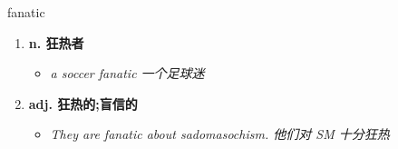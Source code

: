 
\begin{frame}
{\huge fanatic}
\begin{center}
\begin{enumerate}\Large
  \item \textbf{n. 狂热者}
  \begin{itemize}
    \item \em{\Large{a soccer fanatic 一个足球迷}}
  \end{itemize}
  \item \textbf{adj. 狂热的;盲信的}
  \begin{itemize}
    \item \em{\Large{They are fanatic about sadomasochism. 他们对 SM 十分狂热}}
  \end{itemize}
\end{enumerate}
\end{center}
\end{frame}
